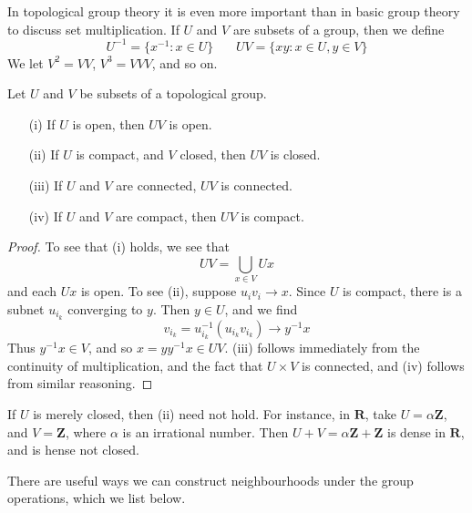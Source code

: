 In topological group theory it is even more important than in basic group theory to discuss set multiplication. If $U$ and $V$ are subsets of a group, then we define
%
\[ U^{-1} = \{ x^{-1} : x \in U \}\ \ \ \ \ \ \ \ UV = \{ xy: x \in U, y \in V \} \]
%
We let $V^2 = VV$, $V^3 = VVV$, and so on.

\begin{theorem}
    Let $U$ and $V$ be subsets of a topological group.
    \begin{enumerate}
        \item[(i)] If $U$ is open, then $UV$ is open.
        \item[(ii)] If $U$ is compact, and $V$ closed, then $UV$ is closed.
        \item[(iii)] If $U$ and $V$ are connected, $UV$ is connected.
        \item[(iv)] If $U$ and $V$ are compact, then $UV$ is compact.
    \end{enumerate}
\end{theorem}
\begin{proof}
    To see that (i) holds, we see that
    \[ UV = \bigcup_{x \in V} Ux \]
    and each $Ux$ is open. To see (ii), suppose $u_i v_i \to x$. Since $U$ is compact, there is a subnet $u_{i_k}$ converging to $y$. Then $y \in U$, and we find
    \[ v_{i_k} = u_{i_k}^{-1} ( u_{i_k} v_{i_k} ) \to y^{-1} x \]
    Thus $y^{-1} x \in V$, and so $x = y y^{-1} x \in UV$. (iii) follows immediately from the continuity of multiplication, and the fact that $U \times V$ is connected, and (iv) follows from similar reasoning.
\end{proof}

\begin{example}
    If $U$ is merely closed, then (ii) need not hold. For instance, in $\mathbf{R}$, take $U = \alpha \mathbf{Z}$, and $V = \mathbf{Z}$, where $\alpha$ is an irrational number. Then $U + V = \alpha \mathbf{Z} + \mathbf{Z}$ is dense in $\mathbf{R}$, and is hense not closed.
\end{example}

There are useful ways we can construct neighbourhoods under the group operations, which we list below.

